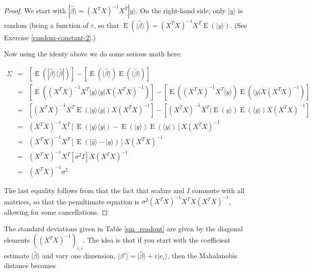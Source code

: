 \documentclass{amsbook}
\begin{document}
\begin{proof}
We start with $|\hat\beta\rangle=\left(X^TX\right)^{-1}X^T|y\rangle$.  On the right-hand side, only $|y\rangle$ is random (being a function of $\varepsilon$, so that $\operatorname{E}\left(|\hat\beta\rangle\right)=\left(X^TX\right)^{-1}X^T\operatorname{E}\left(|y\rangle\right)$.  (See Exercise \ref{random-constant-2}.)
  
Now using the identy above we do some serious math here:

$$
\begin{array}{rcl}
\Sigma &=& \left[\operatorname{E}\left(|\hat\beta\rangle\langle\hat\beta|\right)\right] - \left[\operatorname{E}\left(|\hat\beta\rangle\right)\operatorname{E}\left(\langle\hat\beta|\right)\right] \\
&=& \left[\operatorname{E}\left(\left(X^TX\right)^{-1}X^T|y\rangle\langle y|X\left(X^TX\right)^{-1}\right)\right]-\left[\operatorname{E}\left(\left(X^TX\right)^{-1}X^T|y\rangle\right)\operatorname{E}\left(\langle y|X\left(X^TX\right)^{-1}\right)\right] \\
&=& \left[\left(X^TX\right)^{-1}X^T\operatorname{E}\left(|y\rangle\langle y|\right)X\left(X^TX\right)^{-1}\right]-\left[\left(X^TX\right)^{-1}X^T|\operatorname{E}\left(y\rangle\right)\operatorname{E}\left(\langle y|\right)X\left(X^TX\right)^{-1}\right] \\
&=& \left(X^TX\right)^{-1}X^T\left[\operatorname{E}\left(|y\rangle\langle y|\right)-\operatorname{E}\left(|y\rangle\right)\operatorname{E}\left(\langle y|\right)\right]X\left(X^TX\right)^{-1} \\
&=& \left(X^TX\right)^{-1}X^T\left[\operatorname{E}\left(|\hat y\rangle-|y\rangle\right)\right]X\left(X^TX\right)^{-1} \\
&=& \left(X^TX\right)^{-1}X^T\left[\sigma^2I\right]X\left(X^TX\right)^{-1} \\
&=& \left(X^TX\right)^{-1}\sigma^2
\end{array}
$$

The last equality follows from that the fact that scalars and $I$ commute with all matrices, so that the penultimate equation is $\sigma^2\left(X^TX\right)^{-1}X^TX\left(X^TX\right)^{-1}$, allowing for some cancellations.
\end{proof}

The standard deviations given in Table \ref{sm_readout} are given by the diagonal elements $\left(\left(X^TX\right)^{-1}\right)_{i,i}$.  The idea is that if you start with the coefficient estimate $|\hat\beta\rangle$ and vary one dimension, $|\beta'\rangle=|\hat\beta\rangle+\varepsilon|e_i\rangle$, then the Mahalanobis distance becomes 
\end{document}
